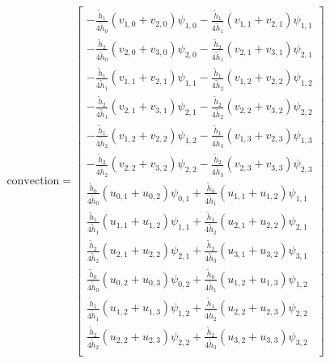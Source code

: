 \begin{equation}
    \mbox{convection}
    =
    \begin{bmatrix}
    - \frac{\tilde{h}_1}{4 \tilde{h}_0} \left( v_{1,0} + v_{2,0} \right) \psi_{1,0} - \frac{\tilde{h}_1}{4 \tilde{h}_1} \left( v_{1,1} + v_{2,1} \right) \psi_{1,1} \\[10pt]

    - \frac{\tilde{h}_2}{4 \tilde{h}_0} \left( v_{2,0} + v_{3,0} \right) \psi_{2,0} - \frac{\tilde{h}_2}{4 \tilde{h}_1} \left( v_{2,1} + v_{3,1} \right) \psi_{2,1} \\[10pt]

    - \frac{\tilde{h}_1}{4 \tilde{h}_1} \left( v_{1,1} + v_{2,1} \right) \psi_{1,1} - \frac{\tilde{h}_1}{4 \tilde{h}_2} \left( v_{1,2} + v_{2,2} \right) \psi_{1,2} \\[10pt]

    - \frac{\tilde{h}_2}{4 \tilde{h}_1} \left( v_{2,1} + v_{3,1} \right) \psi_{2,1} - \frac{\tilde{h}_2}{4 \tilde{h}_2} \left( v_{2,2} + v_{3,2} \right) \psi_{2,2} \\[10pt]

    - \frac{\tilde{h}_1}{4 \tilde{h}_2} \left( v_{1,2} + v_{2,2} \right) \psi_{1,2} - \frac{\tilde{h}_1}{4 \tilde{h}_3} \left( v_{1,3} + v_{2,3} \right) \psi_{1,3} \\[10pt]

    - \frac{\tilde{h}_2}{4 \tilde{h}_2} \left( v_{2,2} + v_{3,2} \right) \psi_{2,2} - \frac{\tilde{h}_2}{4 \tilde{h}_3} \left( v_{2,3} + v_{3,3} \right) \psi_{2,3} \\[10pt]

    \frac{\tilde{h}_0}{4 \tilde{h}_0} \left( u_{0,1} + u_{0,2} \right) \psi_{0,1} + \frac{\tilde{h}_0}{4 \tilde{h}_1} \left( u_{1,1} + u_{1,2} \right) \psi_{1,1} \\[10pt]

    \frac{\tilde{h}_1}{4 \tilde{h}_1} \left( u_{1,1} + u_{1,2} \right) \psi_{1,1} + \frac{\tilde{h}_1}{4 \tilde{h}_2} \left( u_{2,1} + u_{2,2} \right) \psi_{2,1} \\[10pt]

    \frac{\tilde{h}_2}{4 \tilde{h}_2} \left( u_{2,1} + u_{2,2} \right) \psi_{2,1} + \frac{\tilde{h}_2}{4 \tilde{h}_3} \left( u_{3,1} + u_{3,2} \right) \psi_{3,1} \\[10pt]

    \frac{\tilde{h}_0}{4 \tilde{h}_0} \left( u_{0,2} + u_{0,3} \right) \psi_{0,2} + \frac{\tilde{h}_0}{4 \tilde{h}_1} \left( u_{1,2} + u_{1,3} \right) \psi_{1,2} \\[10pt]

    \frac{\tilde{h}_1}{4 \tilde{h}_1} \left( u_{1,2} + u_{1,3} \right) \psi_{1,2} + \frac{\tilde{h}_1}{4 \tilde{h}_2} \left( u_{2,2} + u_{2,3} \right) \psi_{2,2} \\[10pt]

    \frac{\tilde{h}_2}{4 \tilde{h}_2} \left( u_{2,2} + u_{2,3} \right) \psi_{2,2} + \frac{\tilde{h}_2}{4 \tilde{h}_3} \left( u_{3,2} + u_{3,3} \right) \psi_{3,2} \\
    \end{bmatrix}
\end{equation}
